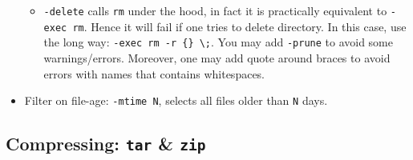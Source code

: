 \documentclass[a4paper,12pt,%
              final%
              ]{article}
\begin{document}
\begin{itemize}
    \begin{itemize}
      \item \texttt{-delete} calls \texttt{rm} under the hood, in fact it is practically equivalent to \texttt{-exec rm}. Hence it will fail if one tries to delete directory. In this case, use the long way: \verb|-exec rm -r {} \;|. You may add \verb|-prune| to avoid some warnings/errors. Moreover, one may add quote around braces to avoid errors with names that contains whitespaces.
    \end{itemize}
  \item Filter on file-age: \verb|-mtime N|, selects all files older than \verb|N| days.
\end{itemize}

\subsection{Compressing: \texttt{tar} \& \texttt{zip}}
\end{document}
